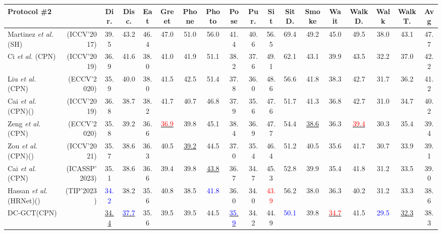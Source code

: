 \documentclass[journal]{IEEEtran}
\begin{document}
\begin{table*}[htbp]
{\begin{tabular}{lr|ccccccccccccccc|c}
\toprule[1mm]



\bf{Protocol \#2} &                              & Dir. & Disc. & Eat & Greet & Phone & Photo & Pose & Pur. & Sit & SitD. & Smoke & Wait & WalkD. & Walk & WalkT. & Avg \\
\hline
Martinez \textit{et al.} \cite{martinez2017simple}(SH) &(ICCV'2017) &39.5 &43.2 &46.4 &47.0 &51.0 &56.0 &41.4 &40.6 &56.5 &69.4 &49.2 &45.0 &49.5 &38.0 &43.1 &47.7 \\
Ci \textit{et al.} \cite{ci2019optimizing}(CPN) &(ICCV'2019) &36.9 &41.6 &38.0 &41.0 &41.9 &51.1 &38.2 &37.6 &49.1 &62.1 &43.1 &39.9 &43.5 &32.2 &37.0 &42.2 \\
Liu \textit{et al.} \cite{liu2020comprehensive} (CPN)&(ECCV'2020) &35.9 &40.0 &38.0 &41.5 &42.5 &51.4 &37.8 &36.0 &48.6 &56.6 &41.8 &38.3 &42.7 &31.7 &36.2 &41.2 \\
Cai \textit{et al.} \cite{cai2019exploiting} (CPN)() &(ICCV'2019) &36.8 &38.7 &38.2 &41.7 &40.7 &46.8 &37.9 &35.6 &47.6 &51.7 &41.3 &36.8 &42.7 &31.0 &34.7 &40.2 \\
Zeng \textit{et al.} \cite{zeng2020srnet} (CPN)&(ECCV'2020) &35.8 &39.2 &36.6 &\underline{ \textcolor{red}{36.9}} &39.8 &45.1 &38.4 &36.9 &47.7 &54.4 &\underline{38.6} &36.3 &\underline{ \textcolor{red}{39.4}} &30.3 &35.4 &39.4 \\
Zou \textit{et al.} \cite{zou2021modulated}(CPN)()  &(ICCV'2021) &35.7 &38.6 &36.3 &40.5 &\underline{39.2} &44.5 &37.0 &35.4 &46.4 &51.2 &40.5 &35.6 &41.7 &30.7 &33.9 &39.1 \\

Cai \textit{et al.} \cite{cai2023htnet}(CPN) &(ICASSP'2023) &35.1 &38.6 &36.6 &39.4 &39.8 &\underline{43.8} &36.7 &34.7 &45.3 &52.8 &39.9 &35.4 &41.8 &31.2 &33.5 &39.0 \\

Hassan \textit{et al.} \cite{hassan2023regular}(HRNet)() &(TIP'2023) &\textcolor{blue}{34.2} &38.2 &35.6 &40.8 &38.5 &\textcolor{blue}{41.8} &36.0 &34.0 &\textcolor{red}{43.9} &56.2 &38.0 &36.3 &40.2 &31.2 &33.3 &38.6 \\




\hline
DC-GCT(CPN)  &                       &\underline{34.4} &\underline{ \textcolor{blue}{37.7}} &35.6 &39.5 &39.5 &44.5 &\underline{ \textcolor{blue}{35.9}} &34.2 &44.9 &\textcolor{blue}{50.1} &39.8 &\underline{ \textcolor{red}{34.7}} &41.5 &\textcolor{blue}{29.5} &\underline{32.3} &38.3 \\ 


\end{tabular}}
\end{table*}
\end{document}
